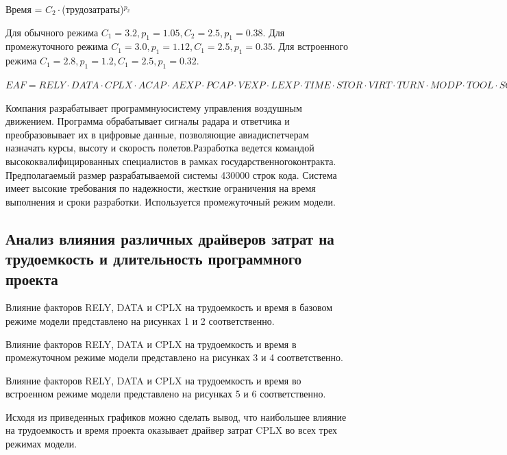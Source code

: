 \documentclass[a4paper,14pt]{article}
\begin{document}
Время = $C_2 \cdot $(трудозатраты)$^{p_2}$

Для обычного режима $C_1 = 3.2, p_1 = 1.05, C_2 = 2.5, p_1 = 0.38$.
Для промежуточного режима $C_1 = 3.0, p_1 = 1.12, C_1 = 2.5, p_1 = 0.35$.
Для встроенного режима $C_1 = 2.8, p_1 = 1.2, C_1 = 2.5, p_1 = 0.32$.

$EAF = RELY \cdot DATA \cdot  CPLX \cdot ACAP \cdot AEXP \cdot PCAP \cdot VEXP \cdot LEXP \cdot TIME \cdot STOR \cdot VIRT \cdot TURN \cdot MODP \cdot TOOL \cdot SCED$

Компания  разрабатывает  программнуюсистему  управления воздушным движением. Программа обрабатывает сигналы радара и ответчика и преобразовывает их в цифровые данные, позволяющие авиадиспетчерам  назначать  курсы,  высоту  и  скорость  полетов.Разработка ведется командой высококвалифицированных специалистов в  рамках государственногоконтракта.  Предполагаемый  размер разрабатываемой системы 430000 строк кода. Система имеет высокие требования по надежности, жесткие ограничения на время выполнения и сроки разработки. Используется промежуточный режим модели.

\subsection*{Анализ  влияния различных  драйверов  затрат  на  трудоемкость  и  длительность программного проекта}

Влияние факторов RELY, DATA и CPLX на трудоемкость и время в базовом режиме модели представлено на рисунках 1 и 2 соответственно.

Влияние факторов RELY, DATA и CPLX на трудоемкость и время в промежуточном режиме модели представлено на рисунках 3 и 4 соответственно.


Влияние факторов RELY, DATA и CPLX на трудоемкость и время во встроенном режиме модели представлено на рисунках 5 и 6 соответственно.

Исходя из приведенных графиков можно сделать вывод, что наибольшее влияние на трудоемкость и время проекта оказывает драйвер затрат CPLX во всех трех режимах модели.
\end{document}
